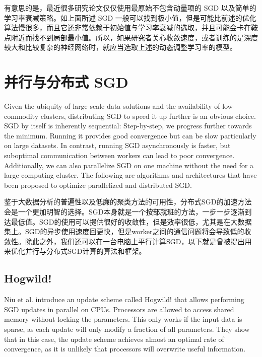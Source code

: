 \documentclass{article}
\begin{document}
有意思的是，最近很多研究论文仅仅使用最原始不包含动量项的 SGD 以及简单的学习率衰减策略。如上面所述 SGD 一般可以找到极小值，但是可能比前述的优化算法慢很多，而且它还非常依赖于初始值与学习率衰减的选取，并且可能会卡在鞍点附近而找不到局部最小值。所以，如果研究者关心收敛速度，或者训练的是深度较大和比较复杂的神经网络时，就应当选取上述的动态调整学习率的模型。

\section{并行与分布式 SGD} \label{sec:parallelizing}

Given the ubiquity of large-scale data solutions and the availability of low-commodity clusters, distributing SGD to speed it up further is an obvious choice.
SGD by itself is inherently sequential: Step-by-step, we progress further towards the minimum. Running it provides good convergence but can be slow particularly on large datasets. In contrast, running SGD asynchronously is faster, but suboptimal communication between workers can lead to poor convergence. Additionally, we can also parallelize SGD on one machine without the need for a large computing cluster. The following are algorithms and architectures that have been proposed to optimize parallelized and distributed SGD.

鉴于大数据分析的普遍性以及低廉的聚类方法的可用性，分布式SGD的加速方法会是一个更加明智的选择。SGD本身就是一个按部就班的方法，一步一步逐渐到达最低值。SGD的使用可以提供很好的收敛性，但是效率很低，尤其是在大数据集上。SGD的异步使用速度回更快，但是worker之间的通信问题将会导致低的收敛性。除此之外，我们还可以在一台电脑上平行计算SGD，以下就是曾被提出用来优化并行与分布式SGD计算的算法和框架。

\subsection{Hogwild!}

Niu et al. \cite{Niu2011} introduce an update scheme called Hogwild! that allows performing SGD updates in parallel on CPUs. Processors are allowed to access shared memory without locking the parameters. This only works if the input data is sparse, as each update will only modify a fraction of all parameters. They show that in this case, the update scheme achieves almost an optimal rate of convergence, as it is unlikely that processors will overwrite useful information.
\end{document}
